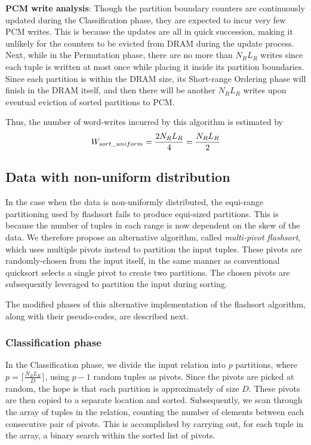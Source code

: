 \textbf{PCM write analysis}: Though the partition boundary counters are
continuously updated during the Classification phase, they are expected to incur
very few PCM writes. This is because the updates are all in quick succession,
making it unlikely for the counters to be evicted from DRAM during the update
process. Next, while in the Permutation phase, there are no more than $N_R L_R$
writes since each tuple is written at most once while placing it inside its
partition boundaries. Since each partition is within the DRAM size, its
Short-range Ordering phase will finish in the DRAM itself, and then there will
be another $N_R L_R$ writes upon eventual eviction of sorted partitions to PCM. 

Thus, the number of word-writes incurred by this algorithm is estimated by
\begin{equation} \label{eq:sort} W_{sort\_uniform} = \dfrac{2N_RL_R}{4} = \dfrac{N_R
L_R}{2} \end{equation}

\subsection{Data with non-uniform distribution} \label{sort_non_uniform} 

In the case when the data is non-uniformly distributed, the equi-range
partitioning used by flashsort fails to produce equi-sized partitions. This is
because the number of tuples in each range is now dependent on the skew of the
data.  We therefore propose an alternative algorithm, called \emph{multi-pivot flashsort}, 
which uses multiple pivots
instead to partition the input tuples. These pivots are randomly-chosen from the input
itself, in the same manner as conventional quicksort selects a single pivot to
create two partitions. The chosen pivots are subsequently leveraged to partition the 
input during sorting.  

The modified phases of this alternative implementation of the flashsort algorithm, along 
with their pseudo-codes, are described next.

\subsubsection{Classification phase} In the Classification phase, we divide the
input relation into $p$ partitions, where $p = \lceil \frac{N_R L_R}{D}
\rceil$, using $p-1$ random tuples as pivots. Since the pivots are picked at
random, the hope is that each partition is approximately of size $D$.  These
pivots are then copied to a separate location and sorted. Subsequently, we scan
through the array of tuples in the relation, counting the number of elements
between each consecutive pair of pivots. This is accomplished by carrying out,
for each tuple in the array, a binary search within the sorted list of pivots.

